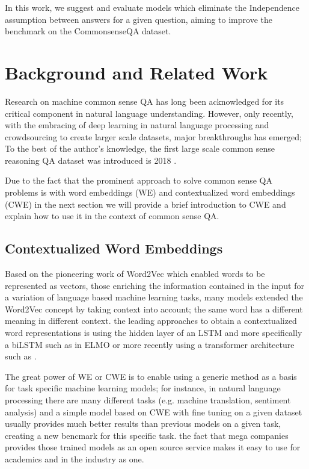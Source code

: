 \documentclass{article}
\begin{document}
In this work, we suggest and evaluate models which eliminate the Independence assumption between answers for a given question, aiming to improve the benchmark on the CommonsenseQA dataset. 

\section{Background and Related Work}
Research on machine common sense QA has long been acknowledged for its critical component in natural language understanding. However, only recently, with the embracing of deep learning in natural language processing and crowdsourcing to create larger scale datasets, major breakthroughs has emerged; To the best of the author's knowledge, the first large scale common sense reasoning QA dataset was introduced is 2018 \cite{storks2019commonsense}.

Due to the fact that the prominent approach to solve common sense QA problems is with word embeddings (WE) and contextualized word embeddings (CWE) in the next section we will provide a brief introduction to CWE and explain how to use it in the context of common sense QA.


\subsection{Contextualized Word Embeddings}
Based on the pioneering work of Word2Vec \cite{mikolov2013distributed} which enabled words to be represented as vectors, those
enriching the information contained in the input for a variation of language based machine learning tasks, many models extended the Word2Vec concept by taking context into account; the same word has a different meaning in different context. the leading approaches to obtain a contextualized word representations is using the hidden layer of an LSTM \cite{hochreiter1997long} and more specifically a biLSTM such as in ELMO \cite{peters2018deep} or more recently using a transformer architecture such as \cite{devlin2018bert,yang2019xlnet}.

The great power of WE or CWE is to enable using a generic method as a basis for task specific machine learning models; for instance, in natural language processing there are many different tasks (e.g. machine translation, sentiment analysis) and a simple model based on CWE with fine tuning on a given dataset usually provides much better results than previous models on a given task, creating a new bencmark for this specific task. the fact that mega companies provides those trained models as an open source service makes it easy to use for academics and in the industry as one.
\end{document}
